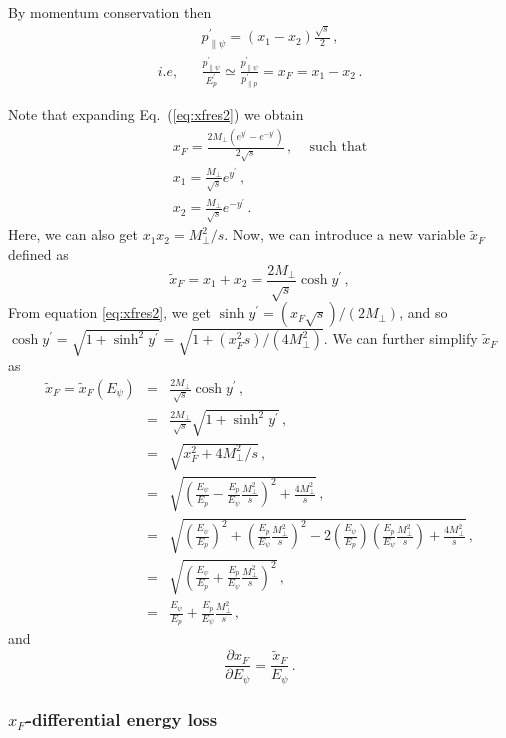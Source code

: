 \documentclass[11pt,onecolumn]{article}
\newcommand{\beq}{\begin{equation}}
\newcommand{\eeq}{\end{equation}}
\newcommand{\bqa}{\begin{eqnarray}}
\newcommand{\eqa}{\end{eqnarray}}
\begin{document}
By momentum conservation then
%
\bqa
&& p_{\parallel \psi}^\prime = (x_1 - x_2) \frac{\sqrt{s}}{2} \, , \nonumber \\ i.e, && \frac{p_{\parallel \psi}^\prime}{E_p^\prime} \simeq \frac{p_{\parallel \psi}^\prime}{p_{\parallel p}^\prime} = x_F = x_1 - x_2 \, .
\eqa

Note that expanding Eq.~(\ref{eq:xfres2}) we obtain
%
\bqa
&& x_F = \frac{2 M_\perp (e^{y^\prime}- e^{-y^\prime})}{ 2 \sqrt{s}} \, , \, \quad \text{such that} \, \nonumber \\
&& x_1 = \frac{M_\perp}{\sqrt{s}} e^{y^\prime} \, , \nonumber \\
&& x_2 = \frac{M_\perp}{\sqrt{s}} e^{- y^\prime} \, .
\label{eq:xyeq}
\eqa
Here, we can also get $x_1 x_2 = M_\perp^2/s$.
Now, we can introduce a new variable $\tilde{x}_F$ defined as
%
\beq
\tilde{x}_F = x_1 + x_2 = \frac{2 M_\perp}{\sqrt{s}} \cosh y^\prime \, ,
\eeq
%
From equation \eqref{eq:xfres2}, we get $\sinh y^\prime = (x_F \sqrt{s})/(2M_\perp)$, and so $\cosh y^\prime = \sqrt{1+\sinh^2y^\prime} = \sqrt{1+ (x_F^2 s)/(4M_\perp^2)}$.
%
We can further simplify $\tilde{x}_F$ as
\bqa
\tilde{x}_F = \tilde{x}_F(E_\psi) &=&  \frac{2 M_\perp}{\sqrt{s}} \cosh y^\prime \nonumber \, , \\
 &=&  \frac{2 M_\perp}{\sqrt{s}} \sqrt{1+\sinh^2 y^\prime} \, , \nonumber \\
&=& \sqrt{x_F^2 + 4 M_\perp^2/s} \, , \\
&=& \sqrt{\left(\frac{E_\psi}{E_p} - \frac{E_p}{E_\psi} \frac{M_\perp^2}{s}\right)^2 + \frac{4 M_\perp^2}{s}}  \, , \nonumber \\
&=& \sqrt{\left(\frac{E_\psi}{E_p}\right)^2 + \left(\frac{E_p}{E_\psi}\frac{M_\perp^2}{s}\right)^2 - 2 \left(\frac{E_\psi}{E_p}\right) \left(\frac{E_p}{E_\psi} \frac{M_\perp^2}{s}\right) + \frac{4 M_\perp^2}{s}} \, , \nonumber \\
&=& \sqrt{\left(\frac{E_\psi}{E_p} + \frac{E_p}{E_\psi} \frac{M_\perp^2}{s}\right)^2}  \, , \nonumber \\
&=& \frac{E_\psi}{E_p} + \frac{E_p}{E_\psi} \frac{M_\perp^2}{s} \, ,
\eqa
%
and
%
\beq
\frac{\partial x_F}{\partial E_\psi} = \frac{\tilde{x}_F}{E_\psi} \, .
\label{eq:xfd}
\eeq

\subsubsection{$x_F$-differential energy loss }
\end{document}
